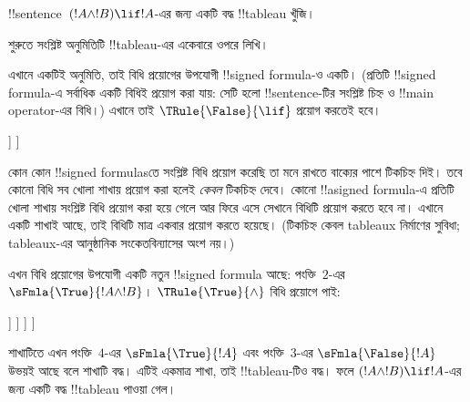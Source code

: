 \documentclass[../../../include/open-logic-section]{subfiles}
\begin{document}
      {}
      {}


\begin{ex}
!!{sentence}~$(!A \land !B) \lif !A$-এর জন্য একটি বদ্ধ
!!{tableau} খুঁজি।

শুরুতে সংশ্লিষ্ট অনুমিতিটি !!{tableau}-এর একেবারে ওপরে লিখি।
\begin{oltableau}
  [\sFmla{\False}{(\formula{A} \land \formula{B}) \lif \formula{A}},
    just = \TAss]
\end{oltableau}

এখানে একটিই অনুমিতি, তাই বিধি প্রয়োগের উপযোগী !!{signed formula}-ও
একটি। (প্রতিটি !!{signed formula}-এ সর্বাধিক একটি বিধিই প্রয়োগ করা
যায়: সেটি হলো !!{sentence}-টির সংশ্লিষ্ট চিহ্ন ও !!{main operator}-এর
বিধি।) এখানে তাই $\TRule{\False}{\lif}$ প্রয়োগ করতেই হবে।
\begin{oltableau}
  [\sFmla{\False}{(\formula{A} \land \formula{B}) \lif \formula{A}},
    checked, just = \TAss
    [\sFmla{\True}{\formula{A} \land \formula{B}},
      just={\TRule{\False}{\lif}[1]}
      [\sFmla{\False}{\formula{A}}, just={\TRule{\False}{\lif}[1]}]
    ]
  ]
\end{oltableau}
কোন কোন !!{signed formula}sতে সংশ্লিষ্ট বিধি প্রয়োগ করেছি তা মনে
রাখতে বাক্যের পাশে টিকচিহ্ন দিই। তবে কোনো বিধি সব খোলা শাখায়
প্রয়োগ করা হলেই \emph{কেবল} টিকচিহ্ন দেবে। কোনো !!a{signed formula}-এ
প্রতিটি খোলা শাখায় সংশ্লিষ্ট বিধি প্রয়োগ করা হয়ে গেলে আর ফিরে এসে
সেখানে বিধিটি প্রয়োগ করতে হবে না। এখানে একটি শাখাই আছে, তাই বিধিটি
মাত্র একবার প্রয়োগ করতে হয়েছে। (টিকচিহ্ন কেবল tableaux নির্মাণের
সুবিধা; tableaux-এর আনুষ্ঠানিক সংকেতবিন্যাসের অংশ নয়।)

এখন বিধি প্রয়োগের উপযোগী একটি নতুন !!{signed formula} আছে: পংক্তি~$2$-এর
$\sFmla{\True}{!A \land !B}$। $\TRule{\True}{\land}$ বিধি প্রয়োগে পাই:
\begin{oltableau}
  [\sFmla{\False}{(\formula{A} \land \formula{B}) \lif \formula{A}},
    checked, just = \TAss
    [\sFmla{\True}{\formula{A} \land \formula{B}},
      just={\TRule{\False}{\lif}[1]}, checked
      [\sFmla{\False}{\formula{A}}, just={\TRule{\False}{\lif}[1]}
        [\sFmla{\True}{\formula{A}}, just={\TRule{\True}{\land}[2]}
          [\sFmla{\True}{\formula{B}}, just={\TRule{\True}{\land}[2]}, close
          ]
        ]
      ]
    ]
  ]
\end{oltableau}
শাখাটিতে এখন পংক্তি~$4$-এর $\sFmla{\True}{!A}$ এবং পংক্তি~$3$-এর
$\sFmla{\False}{!A}$ উভয়ই আছে বলে শাখাটি বদ্ধ। এটিই একমাত্র শাখা,
তাই !!{tableau}-টিও বদ্ধ। ফলে $(!A \land !B) \lif !A$-এর জন্য
একটি বদ্ধ !!{tableau} পাওয়া গেল।
\end{ex}
\end{document}
